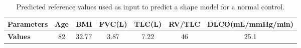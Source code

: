 \begin{table}[htbp]
\centering
\caption{Predicted reference values used as input to predict a shape model for a normal control.}
\label{tab:PatientIndividualData}
\begin{tabular}{| l | c | c| c | c| c | c|}
\hline
\bf{Parameters} & \bf{Age} & \bf{BMI} & \bf{FVC(L)} & \bf{TLC(L)} & \bf{RV/TLC} & \bf{DLCO(mL/mmHg/min)}\\
\hline 
\bf{Values} & 82 & 32.77 & 3.87 & 7.22 & 46 & 25.1\\
\hline
\end{tabular}
\end{table}

